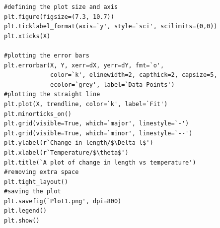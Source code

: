 \documentclass[12pt, a4paper]{article}
\begin{document}
\begin{lstlisting}
#defining the plot size and axis
plt.figure(figsize=(7.3, 10.7))
plt.ticklabel_format(axis=`y', style=`sci', scilimits=(0,0))
plt.xticks(X)

#plotting the error bars
plt.errorbar(X, Y, xerr=dX, yerr=dY, fmt=`o', 
             color=`k', elinewidth=2, capthick=2, capsize=5,
             ecolor=`grey', label=`Data Points')
#plotting the straight line
plt.plot(X, trendline, color=`k', label=`Fit')
plt.minorticks_on()
plt.grid(visible=True, which=`major', linestyle=`-')
plt.grid(visible=True, which=`minor', linestyle=`--')
plt.ylabel(r`Change in length/$\Delta l$')
plt.xlabel(r`Temperature/$\theta$')
plt.title(`A plot of change in length vs temperature')
#removing extra space
plt.tight_layout()
#saving the plot
plt.savefig(`Plot1.png', dpi=800)
plt.legend()
plt.show()
\end{lstlisting}
\end{document}
